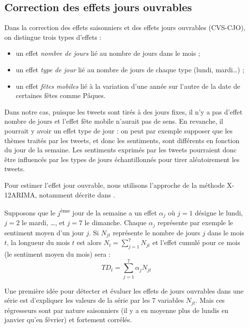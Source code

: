 \documentclass[11pt,french,french]{article}
\begin{document}
\hypertarget{sec:cjo}{%
\subsection{Correction des effets jours ouvrables}\label{sec:cjo}}

Dans la correction des effets saisonniers et des effets jours ouvrables (CVS-CJO), on distingue trois types d'effets :

\begin{itemize}
\item
  un effet \emph{nombre de jours} lié au nombre de jours dans le mois ;
\item
  un effet \emph{type de jour} lié au nombre de jours de chaque type (lundi, mardi\dots) ;
\item
  un effet \emph{fêtes mobiles} lié à la variation d'une année sur l'autre de la date de certaines fêtes comme Pâques.
\end{itemize}

Dans notre cas, puisque les tweets sont tirés à des jours fixes, il n'y a pas d'effet nombre de jours et l'effet fête mobile n'aurait pas de sens.
En revanche, il pourrait y avoir un effet type de jour : on peut par exemple supposer que les thèmes traités par les tweets, et donc les sentiments, sont différents en fonction du jour de la semaine.
Les sentiments exprimés par les tweets pourraient donc être influencés par les types de jours échantillonnés pour tirer aléatoirement les tweets.

Pour estimer l'effet jour ouvrable, nous utilisons l'approche de la méthode X-12ARIMA, notamment décrite dans \cite{L2018}.

Supposons que le \(j\)\textsuperscript{ème} jour de la semaine a un effet \(\alpha_j\) où \(j=1\) désigne le lundi, \(j=2\) le mardi, \dots, et \(j=7\) le dimanche.
Chaque \(\alpha_j\) représente par exemple le sentiment moyen d'un jour \(j\).
Si \(N_{jt}\) représente le nombre de jours \(j\) dans le mois \(t\), la longueur du mois \(t\) est alors \(N_t = \sum_{j=1}^{7} N_{jt}\) et l'effet cumulé pour ce mois (le sentiment moyen du mois) sera :
\[
TD_t = \sum_{j=1}^{7} \alpha_j N_{jt}
\]

Une première idée pour détecter et évaluer les effets de jours ouvrables dans une série est d'expliquer les valeurs de la série par les 7 variables \(N_{jt}\).
Mais ces régresseurs sont par nature saisonniers (il y a en moyenne plus de lundis en janvier qu'en février) et fortement corrélés.
\end{document}
